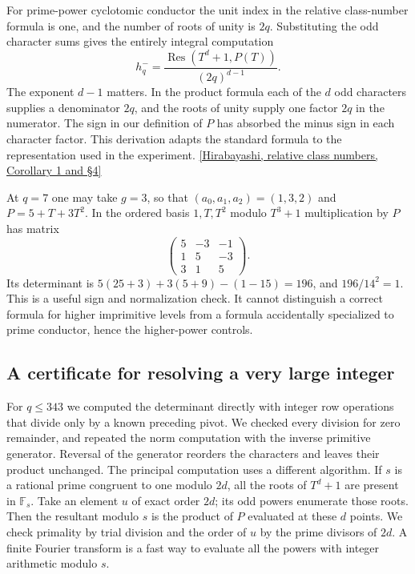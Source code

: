 \documentclass[12pt,letterpaper]{article}
\begin{document}
For prime-power cyclotomic conductor the unit index in the relative class-number formula is one, and the number of roots of unity is \(2q\). Substituting the odd character sums gives the entirely integral computation
\[
    h^-_q=\frac{\operatorname{Res}(T^d+1,P(T))}{(2q)^{d-1}}.
\]
The exponent \(d-1\) matters. In the product formula each of the \(d\) odd characters supplies a denominator \(2q\), and the roots of unity supply one factor \(2q\) in the numerator. The sign in our definition of \(P\) has absorbed the minus sign in each character factor. This derivation adapts the standard formula to the representation used in the experiment. \href{https://cm.osu.cz/sites/default/files/contents/22-2/cm022-2014-2_133-140.pdf}{[Hirabayashi, relative class numbers, Corollary 1 and §4]}

At \(q=7\) one may take \(g=3\), so that \((a_0,a_1,a_2)=(1,3,2)\) and \(P=5+T+3T^2\). In the ordered basis \(1,T,T^2\) modulo \(T^3+1\) multiplication by \(P\) has matrix
\[
  \begin{pmatrix}5&-3&-1\\ 1&5&-3\\ 3&1&5\end{pmatrix}.
\]
Its determinant is \(5(25+3)+3(5+9)-(1-15)=196\), and \(196/14^2=1\). This is a useful sign and normalization check. It cannot distinguish a correct formula for higher imprimitive levels from a formula accidentally specialized to prime conductor, hence the higher-power controls.

\subsection{A certificate for resolving a very large integer}
For \(q\le343\) we computed the determinant directly with integer row operations that divide only by a known preceding pivot. We checked every division for zero remainder, and repeated the norm computation with the inverse primitive generator. Reversal of the generator reorders the characters and leaves their product unchanged. The principal computation uses a different algorithm. If \(s\) is a rational prime congruent to one modulo \(2d\), all the roots of \(T^d+1\) are present in \(\mathbb F_s\). Take an element \(u\) of exact order \(2d\); its odd powers enumerate those roots. Then the resultant modulo \(s\) is the product of \(P\) evaluated at these \(d\) points. We check primality by trial division and the order of \(u\) by the prime divisors of \(2d\). A finite Fourier transform is a fast way to evaluate all the powers with integer arithmetic modulo \(s\).
\end{document}
